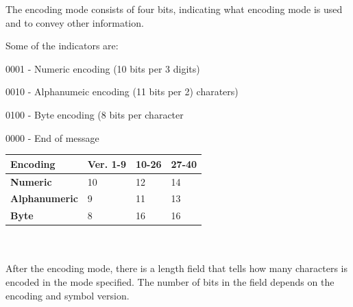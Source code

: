 The encoding mode consists of four bits, indicating what encoding mode is used and to convey other information. 

Some of the indicators are:

\begin{description}
\item 0001 - Numeric encoding (10 bits per 3 digits)
\item 0010 - Alphanumeic encoding (11 bits per 2) charaters)
\item 0100 - Byte encoding (8 bits per character
\item 0000 - End of message
\end{description}

\begin{tabular}{|l|l|l|l|}
\hline
\textbf{Encoding} & \textbf{Ver. 1-9} & \textbf{10-26} & \textbf{27-40} \\
\hline
\textbf{Numeric } & 10 & 12 & 14  \\
\hline
\textbf{Alphanumeric} & 9 & 11 & 13 \\
\hline
\textbf{Byte} & 8 & 16 & 16 \\
\hline
\end{tabular}\\\\

After the encoding mode, there is a length field that tells how many characters is encoded in the mode specified. The number of bits in the field depends on the encoding and symbol version\citep{qrcode1}.



